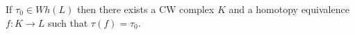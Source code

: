 If $\tau_0 \in Wh(L)$ then there exists a CW complex $K$ and a homotopy equivalence $f: K \to L$ such that $\tau(f) = \tau_0$.
